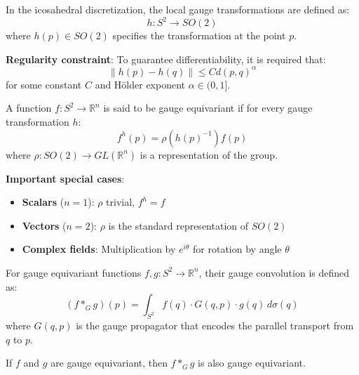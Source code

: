 \begin{definition}\label{def:transformacion_gauge_local}
In the icosahedral discretization, the local gauge transformations are defined as:
\begin{equation}
h: S^2 \to SO(2)
\end{equation}
where $h(p) \in SO(2)$ specifies the transformation at the point $p$.

\textbf{Regularity constraint}: To guarantee differentiability, it is required that:
\begin{equation}
\|h(p) - h(q)\| \leq C d(p,q)^\alpha
\end{equation}
for some constant $C$ and Hölder exponent $\alpha \in (0,1]$.
\end{definition}

\begin{definition}\label{def:funcion_gauge_equivariante}
A function $f: S^2 \to \mathbb{R}^n$ is said to be gauge equivariant if for every gauge transformation $h$:
\begin{equation}
f^h(p) = \rho(h(p)^{-1}) f(p)
\end{equation}
where $\rho: SO(2) \to GL(\mathbb{R}^n)$ is a representation of the group.

\textbf{Important special cases}:
\begin{itemize}
    \item \textbf{Scalars} ($n=1$): $\rho$ trivial, $f^h = f$
    \item \textbf{Vectors} ($n=2$): $\rho$ is the standard representation of $SO(2)$
    \item \textbf{Complex fields}: Multiplication by $e^{i\theta}$ for rotation by angle $\theta$
\end{itemize}
\end{definition}

\begin{theorem}\label{thm:convolucion_gauge_equivariante}
For gauge equivariant functions $f, g: S^2 \to \mathbb{R}^n$, their gauge convolution is defined as:
\begin{equation}
(f *_G g)(p) = \int_{S^2} f(q) \cdot G(q, p) \cdot g(q) \, d\sigma(q)
\end{equation}
where $G(q,p)$ is the gauge propagator that encodes the parallel transport from $q$ to $p$.

If $f$ and $g$ are gauge equivariant, then $f *_G g$ is also gauge equivariant.
\end{theorem}

